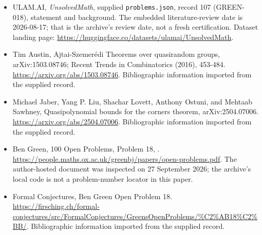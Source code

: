 \documentclass[11pt,a4paper]{article}
\begin{document}
{\small

\begin{itemize}

\item[\hypertarget{source:107:1}{S1}] ULAM.AI, \emph{UnsolvedMath}, supplied \texttt{problems.json}, record 107 (GREEN-018), statement and background. The embedded literature-review date is 2026-08-17; that is the archive’s review date, not a fresh certification. Dataset landing page: \url{https://huggingface.co/datasets/ulamai/UnsolvedMath}.

\item[\hypertarget{source:107:2}{S2}] Tim Austin, Ajtai-Szemerédi Theorems over quasirandom groups, arXiv:1503.08746; Recent Trends in Combinatorics (2016), 453-484. \url{https://arxiv.org/abs/1503.08746}. Bibliographic information imported from the supplied record.

\item[\hypertarget{source:107:3}{S3}] Michael Jaber, Yang P. Liu, Shachar Lovett, Anthony Ostuni, and Mehtaab Sawhney, Quasipolynomial bounds for the corners theorem, arXiv:2504.07006. \url{https://arxiv.org/abs/2504.07006}. Bibliographic information imported from the supplied record.

\item[\hypertarget{source:107:4}{S4}] Ben Green, 100 Open Problems, Problem 18, . \url{https://people.maths.ox.ac.uk/greenbj/papers/open-problems.pdf}. The author-hosted document was inspected on 27 September 2026; the archive’s local code is not a problem-number locator in this paper.

\item[\hypertarget{source:107:5}{S5}] Formal Conjectures, Ben Green Open Problem 18. \url{https://firsching.ch/formal-conjectures/src/FormalConjectures/GreensOpenProblems/%C2%AB18%C2%BB/}. Bibliographic information imported from the supplied record.

\end{itemize}

}

\label{end:107}
\end{document}
